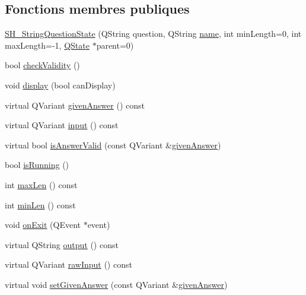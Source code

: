 \subsection*{Fonctions membres publiques}
\begin{DoxyCompactItemize}
\item 
\hyperlink{classSH__StringQuestionState_a83431733b36f67df8691b46cc93a1ea6}{S\-H\-\_\-\-String\-Question\-State} (Q\-String question, Q\-String \hyperlink{classSH__NamedObject_a9f686c6f2a5bcc08ad03d0cee0151f0f}{name}, int min\-Length=0, int max\-Length=-\/1, \hyperlink{classQState}{Q\-State} $\ast$parent=0)
\item 
bool \hyperlink{classSH__QuestionState_a902be003650c33d954d707b2d3ee0bb9}{check\-Validity} ()
\item 
void \hyperlink{classSH__InOutState_a616f88b20478b81b2927a9ddc2b4f521}{display} (bool can\-Display)
\item 
virtual Q\-Variant \hyperlink{classSH__QuestionState_a29cdea8bc55e39e3ed02d24743c30f8c}{given\-Answer} () const 
\item 
virtual Q\-Variant \hyperlink{classSH__InOutState_a8e1b78069343122df7713624a1a5a100}{input} () const 
\item 
virtual bool \hyperlink{classSH__StringQuestionState_a51448b87ffdb9279eaa5e7cc3ff73ce9}{is\-Answer\-Valid} (const Q\-Variant \&\hyperlink{classSH__QuestionState_a29cdea8bc55e39e3ed02d24743c30f8c}{given\-Answer})
\item 
bool \hyperlink{classSH__GenericState_a5f731810dad0cacd28828ccbf1539e4e}{is\-Running} ()
\item 
int \hyperlink{classSH__StringQuestionState_a6dce486c3484c28406b234b5f2f91288}{max\-Len} () const 
\item 
int \hyperlink{classSH__StringQuestionState_a24a95c3ce141e5e26f789720c59d2d3e}{min\-Len} () const 
\item 
void \hyperlink{classSH__InOutState_afc0433d63375063a43e39adca641e330}{on\-Exit} (Q\-Event $\ast$event)
\item 
virtual Q\-String \hyperlink{classSH__InOutState_a17ed7eaf5e3ed5af80a4f9fe65d5bfd9}{output} () const 
\item 
virtual Q\-Variant \hyperlink{classSH__InOutState_a4c674a54f41d2e6ef951b22393dcd89f}{raw\-Input} () const 
\item 
virtual void \hyperlink{classSH__QuestionState_a8fec0a91aed0b2b1699db17169873eb0}{set\-Given\-Answer} (const Q\-Variant \&\hyperlink{classSH__QuestionState_a29cdea8bc55e39e3ed02d24743c30f8c}{given\-Answer})

\end{DoxyCompactItemize}
